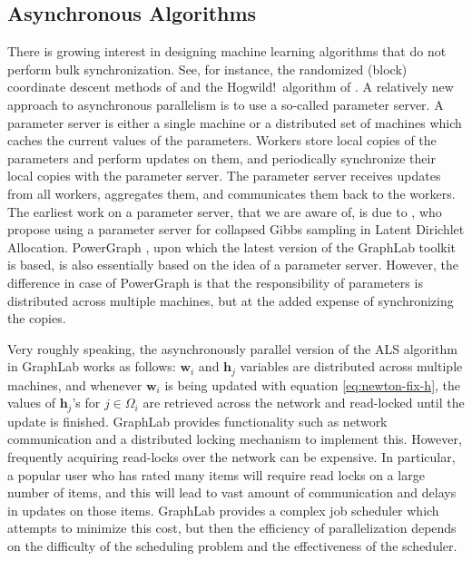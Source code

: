 \documentclass{vldb}
\newcommand{\hb}{\mathbf{h}}
\newcommand{\wb}{\mathbf{w}}
\begin{document}
\subsection{Asynchronous Algorithms}
\label{sec:AsynchrAlgor}

There is growing interest in designing machine learning algorithms that
do not perform bulk synchronization. See, for instance, the randomized
(block) coordinate descent methods of \citet{RicTak13} and the Hogwild!\
algorithm of \citet{RecReWriNiu11}. A relatively new approach to
asynchronous parallelism is to use a so-called parameter server. A
parameter server is either a single machine or a distributed set of
machines which caches the current values of the parameters. Workers
store local copies of the parameters and perform updates on them, and
periodically synchronize their local copies with the parameter
server. The parameter server receives updates from all workers,
aggregates them, and communicates them back to the workers. The earliest
work on a parameter server, that we are aware of, is due to
\citet{SmoNar10}, who propose using a parameter server for collapsed
Gibbs sampling in Latent Dirichlet Allocation. PowerGraph
\citep{GonLowGuBicetal12}, upon which the latest version of the GraphLab
toolkit is based, is also essentially based on the idea of a parameter
server. However, the difference in case of PowerGraph is that the
responsibility of parameters is distributed across multiple machines,
but at the added expense of synchronizing the copies.



Very roughly speaking, the asynchronously parallel version of the ALS
algorithm in GraphLab works as follows: $\wb_i$ and $\hb_j$ variables
are distributed across multiple machines, and whenever $\wb_i$ is being
updated with equation \eqref{eq:newton-fix-h}, the values of $\hb_j$'s
for $j \in \Omega_i$ are retrieved across the network and read-locked
until the update is finished.  GraphLab provides functionality such as
network communication and a distributed locking mechanism to implement
this. However, frequently acquiring read-locks over the network can be
expensive.  In particular, a popular user who has rated many items will
require read locks on a large number of items, and this will lead to
vast amount of communication and delays in updates on those items.
GraphLab provides a complex job scheduler which attempts to minimize
this cost, but then the efficiency of parallelization depends on the
difficulty of the scheduling problem and the effectiveness of the
scheduler. 
\end{document}
